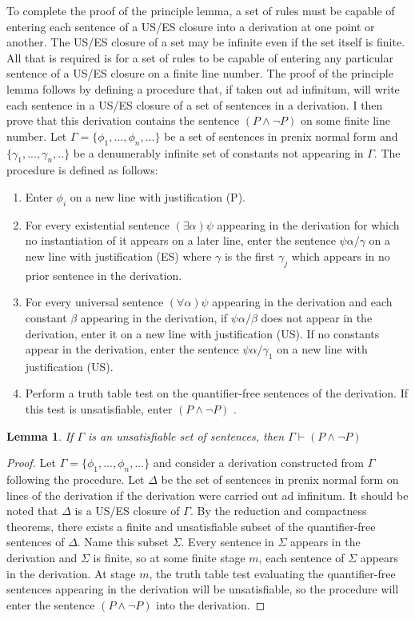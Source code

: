 \documentclass[12pt]{article}
\newtheorem{lemma}[theorem]{Lemma}
\theoremstyle{definition}
\theoremstyle{remark}
\begin{document}
To complete the proof of the principle lemma, a set of rules must be capable of entering each sentence of a US/ES closure into a derivation at one point or another. The US/ES closure of a set may be infinite even if the set itself is finite. All that is required is for a set of rules to be capable of entering any particular sentence of a US/ES closure on a finite line number. The proof of the principle lemma follows by defining a procedure that, if taken out ad infinitum, will write each sentence in a US/ES closure of a set of sentences in a derivation. I then prove that this derivation contains the sentence $(P \land \neg P)$ on some finite line number. Let $\Gamma = \{ \phi_1, ..., \phi_n, ... \}$ be a set of sentences in prenix normal form and $\{ \gamma_1, ..., \gamma_n, .. \}$ be a denumerably infinite set of constants not appearing in $\Gamma$. The procedure is defined as follows:

\begin{enumerate}
	\item Enter $\phi_i$ on a new line with justification (P).
	\item For every existential sentence $(\exists \alpha)\psi$ appearing in the derivation for which no instantiation of it appears on a later line, enter the sentence $\psi\alpha/\gamma$ on a new line with justification (ES) where $\gamma$ is the first $\gamma_j$ which appears in no prior sentence in the derivation.
	\item For every universal sentence $(\forall \alpha)\psi$ appearing in the derivation and each constant $\beta$ appearing in the derivation, if $\psi\alpha/\beta$ does not appear in the derivation, enter it on a new line with justification (US). If no constants appear in the derivation, enter the sentence $\psi\alpha/\gamma_1$ on a new line with justification (US).
	\item Perform a truth table test on the quantifier-free sentences of the derivation. If this test is unsatisfiable, enter $(P \land \neg P)$ .
\end{enumerate} 

\begin{lemma}
	If $\Gamma$ is an unsatisfiable set of sentences, then $\Gamma \vdash (P \land \neg P)$
\end{lemma} 

\begin{proof}
	Let $\Gamma = \{\phi_1, ..., \phi_n, ...\}$ and consider a derivation constructed from $\Gamma$ following the procedure. Let $\Delta$ be the set of sentences in prenix normal form on lines of the derivation if the derivation were carried out ad infinitum. It should be noted that $\Delta$ is a US/ES closure of $\Gamma$. By the reduction and compactness theorems, there exists a finite and unsatisfiable subset of the quantifier-free sentences of $\Delta$. Name this subset $\Sigma$. Every sentence in $\Sigma$ appears in the derivation and $\Sigma$ is finite, so at some finite stage $m$, each sentence of $\Sigma$ appears in the derivation. At stage $m$, the truth table test evaluating the quantifier-free sentences appearing in the derivation will be unsatisfiable, so the procedure will enter the sentence $(P \land \neg P)$ into the derivation.
\end{proof}
\end{document}
